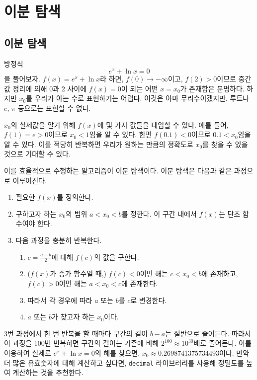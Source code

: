 %
%
%
\chapter{이분 탐색}
\label{ch:bisectsearch} %

\section{이분 탐색}
방정식
\begin{equation}
	e^x + \ln x = 0
\end{equation}
을 풀어보자. $f(x) = e^x + \ln x$라 하면, $f(0) \rightarrow -\infty$이고, $f(2) >0$이므로 중간값 정리에 의해 0과 2 사이에 $f(x)=0$이 되는 어떤 $x=x_0$가 존재함은 분명하다. 하지만 $x_0$를 우리가 아는 수로 표현하기는 어렵다. 이것은 아마 무리수이겠지만, 루트나 $e$, $\pi$ 등으로는 표현할 수 없다.

$x_0$의 실제값을 알기 위해 $f(x)$에 몇 가지 값들을 대입할 수 있다. 예를 들어, $f(1) = e > 0$이므로 $x_0 < 1$임을 알 수 있다. 한편 $f(0.1)<0$이므로 $0.1<x_0$임을 알 수 있다. 이를 적당히 반복하면 우리가 원하는 만큼의 정확도로 $x_0$를 찾을 수 있을 것으로 기대할 수 있다.

이를 효율적으로 수행하는 알고리즘이 이분 탐색이다. 이분 탐색은 다음과 같은 과정으로 이루어진다.
\begin{enumerate}
	\item 필요한 $f(x)$를 정의한다.
	\item 구하고자 하는 $x_0$의 범위 $a<x_0<b$를 정한다. 이 구간 내에서 $f(x)$는 단조 함수여야 한다.
	\item 다음 과정을 충분히 반복한다.
	\begin{enumerate}
		\item $c = \frac{a+b}{2}$에 대해 $f(c)$의 값을 구한다.
		\item ($f(x)$가 증가 함수일 때,) $f(c)<0$이면 해는 $c<x_0<b$에 존재하고, $f(c)>0$이면 해는 $a <x_0<c$에 존재한다.
		\item 따라서 각 경우에 따라 $a$ 또는 $b$를 $c$로 변경한다.
	\item $a$ 또는 $b$가 찾고자 하는 $x_0$이다.
	\end{enumerate}
\end{enumerate}
3번 과정에서 한 번 반복을 할 때마다 구간의 길이 $b - a$는 절반으로 줄어든다. 따라서 이 과정을 100번 반복하면 구간의 길이는 기존에 비해 $2^{100} \approx 10^{30}$배로 줄어든다. 이를 이용하여 실제로 $e^x + \ln x = 0$의 해를 찾으면, $x_0 \approx 0.2698741375734493$이다. 만약 더 많은 유효숫자에 대해 계산하고 싶다면, \texttt{decimal} 라이브러리를 사용해 정밀도를 높여 계산하는 것을 추천한다.

